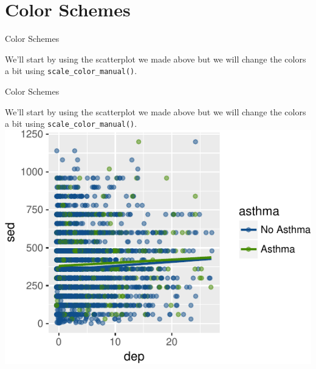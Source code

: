 \section{Color Schemes}\label{color-schemes}

\begin{frame}[fragile]{Color Schemes}

We'll start by using the scatterplot we made above but we will change
the colors a bit using \texttt{scale\_color\_manual()}.

\begin{Shaded}
\begin{Highlighting}[]
\NormalTok{(}\OperatorTok{+}
\StringTok{  }\NormalTok{(}\NormalTok{(}\NormalTok{) }\OperatorTok{+}
\StringTok{  }\NormalTok{(}\NormalTok{(}
               \NormalTok{, }\NormalTok{) }\OperatorTok{+}
\StringTok{  }\NormalTok{(} \NormalTok{(}\NormalTok{, }
                                \NormalTok{))}
\end{Highlighting}
\end{Shaded}

\end{frame}

\begin{frame}[fragile]{Color Schemes}

We'll start by using the scatterplot we made above but we will change
the colors a bit using \texttt{scale\_color\_manual()}.
\includegraphics{09_AdvancedPlotting_files/figure-beamer/cs2-1.pdf}

\end{frame}

